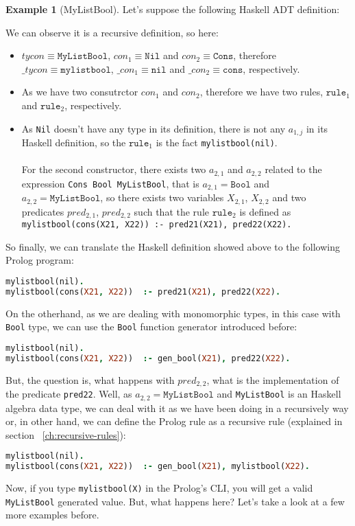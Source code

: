 \documentclass{report}
\theoremstyle{definition}
\newtheorem{example}{Example}[section]
\theoremstyle{definition}
\newcommand{\ttt}[1]{\texttt{#1}}
\begin{document}
\begin{example}[MyListBool]
	Let's suppose the following Haskell ADT definition:
	
	We can observe it is a recursive definition, so here:
	\begin{itemize}
		\item $tycon \equiv \ttt{MyListBool}$, $con_1 \equiv \ttt{Nil}$ and $con_2 \equiv \ttt{Cons}$, therefore $\_tycon \equiv \ttt{mylistbool}$, $\_con_1 \equiv \ttt{nil}$ and $\_con_2 \equiv \ttt{cons}$, respectively.
		\item As we have two consutrctor $con_1$ and $con_2$, therefore we have two rules, $\ttt{rule}_1$ and $\ttt{rule}_2$, respectively.
		\item As \ttt{Nil} doesn't have any type in its definition, there is not any $a_{1,j}$ in its Haskell definition, so the $\ttt{rule}_1$ is the fact \ttt{mylistbool(nil)}.\\\\
		For the second constructor, there exists two $a_{2,1}$ and $a_{2,2}$ related to the expression \ttt{Cons Bool MyListBool}, that is $a_{2,1} = \ttt{Bool}$ and $a_{2,2} = \ttt{MyListBool}$, so there exists two variables $X_{2,1}$, $X_{2,2}$ and two predicates $pred_{2,1}$, $pred_{2,2}$ such that the rule $\ttt{rule}_2$ is defined as \\ \ttt{mylistbool(cons(X21, X22)) :- pred21(X21), pred22(X22).}
	\end{itemize}
	So finally, we can translate the Haskell definition showed above to the following Prolog program:\\
\begin{lstlisting}[language=Prolog]
mylistbool(nil).																										%% rule 1
mylistbool(cons(X21, X22)) 	:- pred21(X21), pred22(X22).						%% rule 2
\end{lstlisting}
On the otherhand, as we are dealing with monomorphic types, in this case with \ttt{Bool} type, we can use the \ttt{Bool} function generator introduced before:\\
\begin{lstlisting}[language=Prolog]
mylistbool(nil).																										%% rule 1
mylistbool(cons(X21, X22)) 	:- gen_bool(X21), pred22(X22).					%% rule 2
\end{lstlisting}
But, the question is, what happens with $pred_{2,2}$, what is the implementation of the predicate \ttt{pred22}. Well, as $a_{2,2} = \ttt{MyListBool}$ and \ttt{MyListBool} is an Haskell algebra data type, we can deal with it as we have been doing in a recursively way or, in other hand, we can define the Prolog rule as a recursive rule (explained in section ~\ref{ch:recursive-rules}):\\
\begin{lstlisting}[language=Prolog]
mylistbool(nil).																										%% rule 1
mylistbool(cons(X21, X22)) 	:- gen_bool(X21), mylistbool(X22).			%% rule 2
\end{lstlisting}
Now, if you type \ttt{mylistbool(X)} in the Prolog's CLI, you will get a valid \ttt{MyListBool} generated value. But, what happens here? Let's take a look at a few more examples before.
\end{example}
\end{document}
